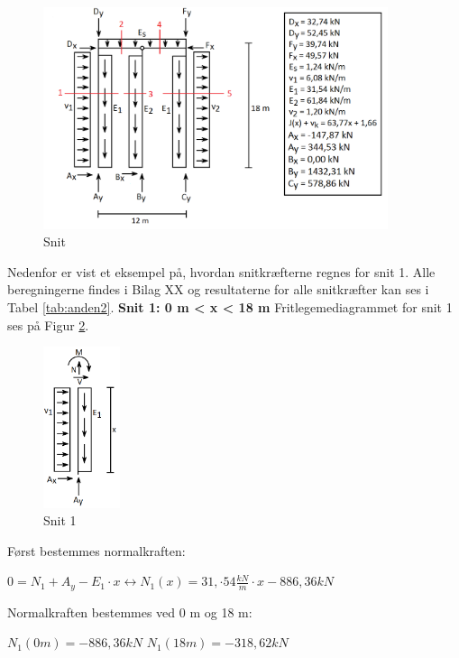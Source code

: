 \begin{figure}[H]
	\centering
	\includegraphics[width=0.9\textwidth]{billeder/snitanvendelse.png}
	\caption{Snit}
	\label{fig:snitanvendelse}
\end{figure}

Nedenfor er vist et eksempel på, hvordan snitkræfterne regnes for snit 1. Alle beregningerne findes i Bilag XX og resultaterne for alle snitkræfter kan ses i Tabel \ref{tab:anden2}.
\newline
\newline
\textbf{Snit 1: 0 m < x < 18 m}
\newline
Fritlegemediagrammet for snit 1 ses på Figur \ref{fig:snitetan}.
\begin{figure}[H]
	\centering
	\includegraphics[width=0.2\textwidth]{billeder/asnitet.png}
	\caption{Snit 1}
	\label{fig:snitetan}
\end{figure}

Først bestemmes normalkraften:
\begin{center}
	$0 = N_1 + A_y - E_1\cdot x \leftrightarrow N_1(x) = 31,\cdot54 \frac{kN}{m} \cdot x - 886,\!36 kN$
\end{center}

Normalkraften bestemmes ved 0 m og 18 m:
\begin{center}
	$N_1(0m) = -886,\!36 kN$
	\newline
	$N_1(18m) = -318,\!62 kN$
\end{center}

